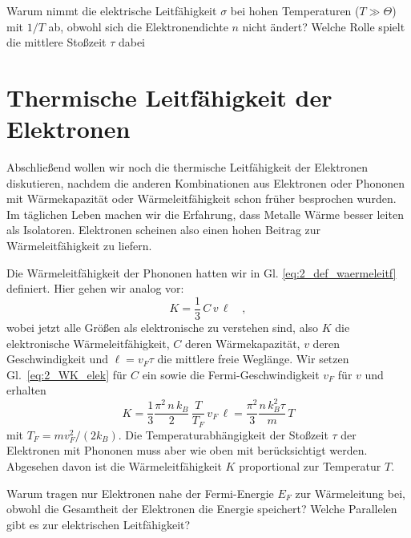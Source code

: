 \begin{questions}
    \item Warum nimmt die elektrische Leitfähigkeit $\sigma$ bei hohen Temperaturen ($T \gg \Theta$) mit $1/T$ ab, obwohl sich die Elektronendichte $n$ nicht ändert? Welche Rolle spielt die mittlere Stoßzeit $\tau$ dabei
\end{questions}

\section{Thermische Leitfähigkeit der Elektronen}

Abschließend wollen wir noch die thermische Leitfähigkeit der Elektronen diskutieren, nachdem die anderen Kombinationen aus Elektronen oder Phononen mit Wärmekapazität oder Wärmeleitfähigkeit schon früher besprochen wurden. Im täglichen Leben machen wir die Erfahrung, dass Metalle Wärme besser leiten als Isolatoren. Elektronen scheinen also einen hohen Beitrag zur Wärmeleitfähigkeit zu liefern.

Die  Wärmeleitfähigkeit der Phononen hatten wir in Gl. \ref{eq:2_def_waermeleitf} definiert. Hier gehen wir analog vor:
\begin{equation}
   K  = \frac{1}{3} \, C \, v \, \ell \quad , 
\end{equation}
wobei jetzt alle Größen als elektronische zu verstehen sind, also $K$ die elektronische Wärmeleitfähigkeit, $C$ deren Wärmekapazität, $v$ deren Geschwindigkeit und $\ell =  v_F \tau$ die mittlere freie Weglänge. Wir setzen Gl.~\ref{eq:2_WK_elek} für $C$ ein sowie die Fermi-Geschwindigkeit $v_F$ für $v$  und erhalten
\begin{equation}
   K  =  \frac{1}{3} \frac{\pi^2 \, n \, k_B}{2}  \, \frac{T}{T_F}  \, v_F \, \ell
   =     \frac{\pi^2 }{3} \frac{ n \, k_B^2 \tau}{m}  \, T 
\end{equation}
mit $T_F = m v_F^2 / (2 k_B)$. Die Temperaturabhängigkeit der Stoßzeit $\tau$ der Elektronen mit Phononen muss aber wie oben mit berücksichtigt werden. Abgesehen davon ist die Wärmeleitfähigkeit $K$ proportional zur Temperatur $T$.


\begin{questions}
    \item Warum tragen nur Elektronen nahe der Fermi-Energie $E_F$ zur Wärmeleitung bei, obwohl die Gesamtheit der Elektronen die Energie speichert? Welche Parallelen gibt es zur elektrischen Leitfähigkeit?

\end{questions}

